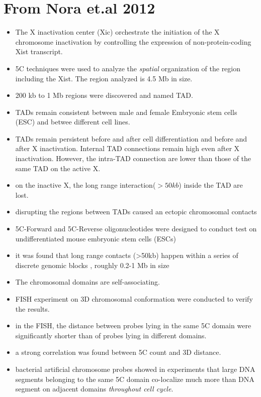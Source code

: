 \documentclass[12pt]{book}
\begin{document}
\section{From Nora et.al 2012 \cite{nora2012spatial}}
\begin{itemize}
 \itemsep1pt  \parskip1pt 
\item The X inactivation center (Xic) orchestrate the initiation of the X chromosome inactivation by controlling the expression of non-protein-coding Xist transcript. 
\item 5C techniques were  used to analyze the \textit{spatial} organization of the region including the Xist. The region analyzed  is 4.5 Mb in size. 
\item 200 kb to 1 Mb regions were discovered and named TAD.
\item TADs remain consistent between male and female Embryonic stem cells (ESC) and betwee different cell lines.
\item TADs remain persistent before and after cell differentiation and before and after X inactivation. Internal TAD connections remain high even after X inactivation. However, the intra-TAD connection are lower than those of the same TAD on the active X.
\item on the inactive X, the long range interaction($>50kb$) inside the TAD are lost. 
\item disrupting the regions between TADs caused an ectopic chromosomal contacts 
\item 5C-Forward and 5C-Reverse oligonucleotides were designed to conduct test on undifferentiated mouse embryonic stem cells (ESCs)
\item it was found that long range contacts (>50kb) happen within a series of discrete genomic blocks , roughly 0.2-1 Mb in size 
\item The chromosomal domains are self-associating. 
\item FISH experiment on 3D chromosomal conformation were conducted to verify the results.
\item in the FISH, the distance between probes lying in the same 5C domain were significantly shorter than of probes lying in different domains. 
\item a strong correlation was found between 5C count and 3D distance. 
\item bacterial artificial chromosome probes showed in experiments that large DNA segments belonging to the same 5C domain co-localize much more than DNA segment on adjacent domains \textit{throughout cell cycle}. 

\end{itemize}
\end{document}
